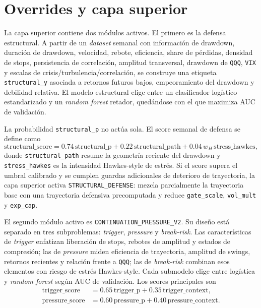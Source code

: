 \documentclass[11pt]{article}
\begin{document}
\section{Overrides y capa superior}
La capa superior contiene dos m\'odulos activos. El primero es la defensa estructural. A partir de un \textit{dataset} semanal con informaci\'on de drawdown, duraci\'on de drawdown, velocidad, rebote, eficiencia, share de p\'erdidas, densidad de stops, persistencia de correlaci\'on, amplitud transversal, drawdown de \texttt{QQQ}, \texttt{VIX} y escalas de crisis/turbulencia/correlaci\'on, se construye una etiqueta \texttt{structural\_y} asociada a retornos futuros bajos, empeoramiento del drawdown y debilidad relativa. El modelo estructural elige entre un clasificador log\'istico estandarizado y un \textit{random forest} retador, qued\'andose con el que maximiza AUC de validaci\'on.

La probabilidad \texttt{structural\_p} no act\'ua sola. El score semanal de defensa se define como
\begin{equation}
\text{structural\_score} = 0.74\,\text{structural\_p} + 0.22\,\text{structural\_path} + 0.04\,w_H\,\text{stress\_hawkes},
\end{equation}
donde \texttt{structural\_path} resume la geometr\'ia reciente del drawdown y \texttt{stress\_hawkes} es la intensidad Hawkes-style de estr\'es. Si el score supera el umbral calibrado y se cumplen guardas adicionales de deterioro de trayectoria, la capa superior activa \texttt{STRUCTURAL\_DEFENSE}: mezcla parcialmente la trayectoria base con una trayectoria defensiva precomputada y reduce \texttt{gate\_scale}, \texttt{vol\_mult} y \texttt{exp\_cap}.

El segundo m\'odulo activo es \texttt{CONTINUATION\_PRESSURE\_V2}. Su dise\~no est\'a separado en tres subproblemas: \textit{trigger}, \textit{pressure} y \textit{break-risk}. Las caracter\'isticas de \textit{trigger} enfatizan liberaci\'on de stops, rebotes de amplitud y estados de compresi\'on; las de \textit{pressure} miden eficiencia de trayectoria, amplitud de swings, retornos recientes y relaci\'on frente a \texttt{QQQ}; las de \textit{break-risk} combinan esos elementos con riesgo de estr\'es Hawkes-style. Cada submodelo elige entre log\'istica y \textit{random forest} seg\'un AUC de validaci\'on. Los scores principales son
\begin{align}
\text{trigger\_score} &= 0.65\,\text{trigger\_p} + 0.35\,\text{trigger\_context}, \\
\text{pressure\_score} &= 0.60\,\text{pressure\_p} + 0.40\,\text{pressure\_context}.
\end{align}
\end{document}
